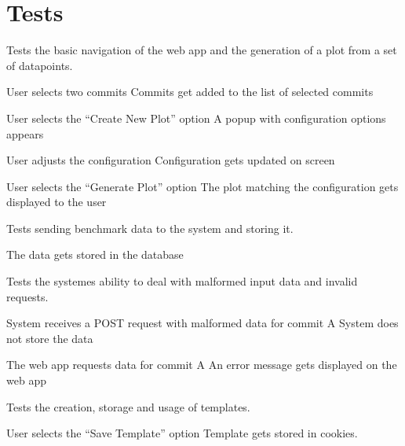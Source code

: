 \section{Tests}


Tests the basic navigation of the web app and the generation of a \gls{plot} from a set of datapoints.

{User selects two commits}
{Commits get added to the list of selected commits}

{User selects the \enquote{Create New Plot} option}
{A popup with configuration options appears}

{User adjusts the configuration}
{Configuration gets updated on screen}

{User selects the \enquote{Generate Plot} option}
{The \gls{plot} matching the configuration gets displayed to the user}


Tests sending benchmark data to the system and storing it.

{The data gets stored in the database}


Tests the systemes ability to deal with malformed input data and invalid requests.

{System receives a POST request with malformed data for commit A}
{System does not store the data}

{The web app requests data for commit A}
{An error message gets displayed on the web app}


Tests the creation, storage and usage of templates.

{User selects the \enquote{Save Template} option}
{Template gets stored in cookies.}

